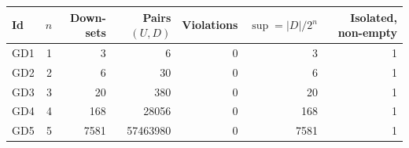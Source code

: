 {\small
\begin{tabular}{@{}lrrrrrr@{}}
\toprule
Id & $n$ & Down-sets & Pairs $(U, D)$ & Violations & $\sup = |D|/2^n$ & Isolated, non-empty \\
\midrule
GD1 & 1 & 3 & 6 & 0 & 3 & 1 \\
GD2 & 2 & 6 & 30 & 0 & 6 & 1 \\
GD3 & 3 & 20 & 380 & 0 & 20 & 1 \\
GD4 & 4 & 168 & 28056 & 0 & 168 & 1 \\
GD5 & 5 & 7581 & 57463980 & 0 & 7581 & 1 \\
\bottomrule
\end{tabular}}
